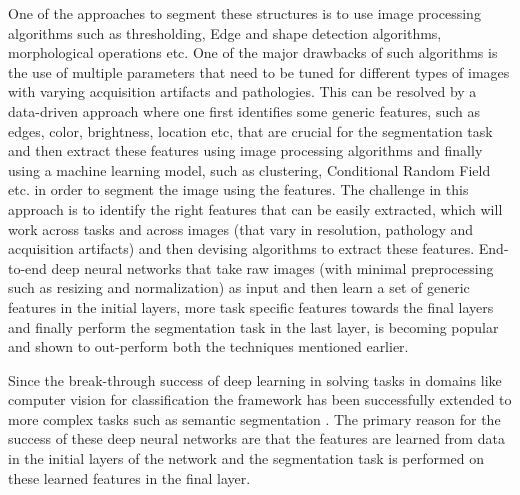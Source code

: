 \documentclass[utf8]{FrontiersinHarvard} %
\begin{document}
One of the approaches to segment these structures is to use image processing algorithms such as thresholding, Edge and shape detection algorithms, morphological operations etc. One of the major drawbacks of such algorithms is the use of multiple parameters that need to be tuned for different types of images with varying acquisition artifacts and pathologies. This can be resolved by a data-driven  approach  where one first identifies  some generic features, such as edges, color, brightness, location etc,  that are crucial for the segmentation task and then extract these features using image processing algorithms and finally using a machine learning model, such as clustering, Conditional Random Field etc. in order to segment the image using the features. The challenge in this approach is to identify the right features that can be easily extracted,  which will work across tasks and across images (that vary in resolution, pathology and  acquisition artifacts) and then devising algorithms to extract these features. End-to-end deep neural networks that take raw images (with minimal preprocessing such as resizing and normalization) as input and then learn a set of generic features in the initial layers, more task specific features towards the final layers and  finally perform the segmentation task in the last layer, is becoming popular and shown to out-perform both the techniques mentioned earlier.


Since the break-through success of deep learning in solving tasks in domains like computer vision for classification \cite{krizhevsky2012imagenet} \cite{simonyan2014very} the framework has been successfully extended to more complex tasks such as semantic segmentation \cite{chen2017deeplab,Yu_2018_ECCV,wang2018under}. The primary reason for the success of  these deep neural networks are that the features are learned from data in the initial layers of  the network and the segmentation task is performed on these learned features in the final layer.
\end{document}
